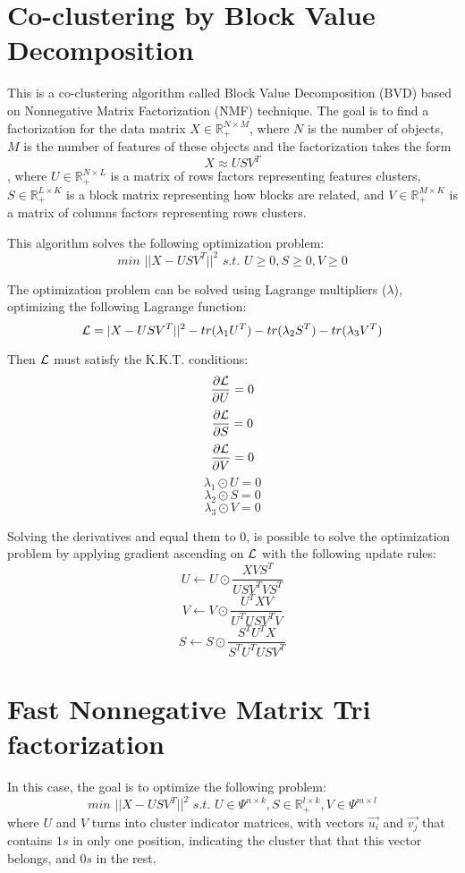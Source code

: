 \documentclass[paper=a4, fontsize=11pt]{scrartcl} %
\numberwithin{equation}{section} %
\numberwithin{figure}{section} %
\numberwithin{table}{section} %
\begin{document}

\section{Co-clustering by Block Value Decomposition}

This is a co-clustering algorithm called Block Value Decomposition (BVD) based on Nonnegative Matrix Factorization (NMF) technique. The goal is to find a factorization for the data matrix $X \in \mathbb{R}_{+}^{N \times M}$, where $N$ is the number of objects, $M$ is the number of features of these objects and the factorization takes the form $$X \approx USV^T$$, where $U \in \mathbb{R}_{+}^{N \times L}$ is a matrix of rows factors representing features clusters, $S \in \mathbb{R}_{+}^{L \times K}$ is a block matrix representing how blocks are related, and $V \in \mathbb{R}_{+}^{M \times K}$ is a matrix of columns factors representing rows clusters.

This algorithm solves the following optimization problem:
$$\textit{min } ||X - USV^T||^2 \textit{ s.t. } U \geq 0, S \geq 0, V \geq 0$$

The optimization problem can be solved using Lagrange multipliers ($\lambda$), optimizing the following Lagrange function:
$${\cal L} = |X - USV^T||^2 - tr(\lambda_1U^T) - tr(\lambda_2S^T) - tr(\lambda_3V^T)$$

Then ${\cal L}$ must satisfy the K.K.T. conditions:
$$\frac{\partial {\cal L}}{\partial U} = 0$$
$$\frac{\partial {\cal L}}{\partial S} = 0$$
$$\frac{\partial {\cal L}}{\partial V} = 0$$
$$\lambda_1 \odot U = 0$$
$$\lambda_2 \odot S = 0$$
$$\lambda_3 \odot V = 0$$

Solving the derivatives and equal them to $0$, is possible to solve the optimization problem by applying gradient ascending on ${\cal L}$ with the following update rules:
$$U \gets U \odot \frac{XVS^T}{USV^TVS^T}$$
$$V \gets V \odot \frac{U^TXV}{U^TUSV^TV}$$
$$S \gets S \odot \frac{S^TU^TX}{S^TU^TUSV^T}$$


\section{Fast Nonnegative Matrix Tri factorization}

In this case, the goal is to optimize the following problem:
$$\textit{min } ||X - USV^T||^2 \textit{ s.t. } U \in \Psi^{n \times k}, S \in \mathbb{R}_{+}^{l \times k}, V \in \Psi^{m \times l}$$ where $U$ and $V$ turns into cluster indicator matrices, with vectors $\vec{u_i}$ and $\vec{v_j}$ that contains $1s$ in only one position, indicating the cluster that that this vector belongs, and $0s$ in the rest.
\end{document}
